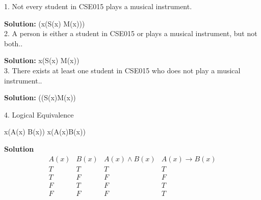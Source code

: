 \documentclass[11pt]{article}
\begin{document}
\large 1. Not every student in CSE015 plays a musical instrument.\\

\item\hspace{2cm} \textbf{Solution:}
\neg (\forall x(S(x) \rightarrow M(x)))\\




\large 2. A person is either a student in CSE015 or plays a musical instrument, but not both..\\

\item \hspace{2cm} \textbf{Solution:}
\exists x(S(x) \oplus M(x))\\



\large 3. There exists at least one student in CSE015 who does not play a musical instrument..\\

\item \hspace{2cm} \textbf{Solution:}
\exists((S(x)\land \neg M(x))\\




\begin{flushleft}
{\Large 4. Logical Equivalence }
\end{flushleft}

\begin{enumerate}

\begin{flushleft}
{\large \forall x(A(x) \land B(x)) \equiv \forall x(A(x)\rightarrow B(x))}
\end{flushleft}
\end {enumerate}




 \hspace{7.2cm} \textbf{Solution}\\
\begin{displaymath}
\begin{array}{|c|c|c|c|}
A(x) & B(x) & A(x) \land B(x) & A(x) \rightarrow B(x) \\ 
T & T & T & T \\
T & F & F & F \\
F & T & F & T \\
F & F & F & T \\
\end{array}
\end{displaymath}
\end{document}
